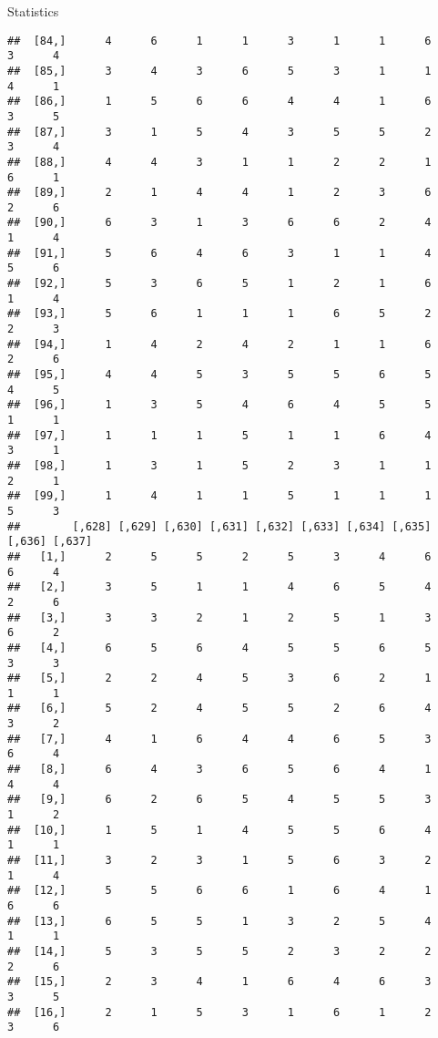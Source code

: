 \documentclass[
  ignorenonframetext,
]{beamer}
\begin{document}
\begin{frame}[fragile]{Statistics}
\begin{verbatim}
##  [84,]      4      6      1      1      3      1      1      6      3      4
##  [85,]      3      4      3      6      5      3      1      1      4      1
##  [86,]      1      5      6      6      4      4      1      6      3      5
##  [87,]      3      1      5      4      3      5      5      2      3      4
##  [88,]      4      4      3      1      1      2      2      1      6      1
##  [89,]      2      1      4      4      1      2      3      6      2      6
##  [90,]      6      3      1      3      6      6      2      4      1      4
##  [91,]      5      6      4      6      3      1      1      4      5      6
##  [92,]      5      3      6      5      1      2      1      6      1      4
##  [93,]      5      6      1      1      1      6      5      2      2      3
##  [94,]      1      4      2      4      2      1      1      6      2      6
##  [95,]      4      4      5      3      5      5      6      5      4      5
##  [96,]      1      3      5      4      6      4      5      5      1      1
##  [97,]      1      1      1      5      1      1      6      4      3      1
##  [98,]      1      3      1      5      2      3      1      1      2      1
##  [99,]      1      4      1      1      5      1      1      1      5      3
##        [,628] [,629] [,630] [,631] [,632] [,633] [,634] [,635] [,636] [,637]
##   [1,]      2      5      5      2      5      3      4      6      6      4
##   [2,]      3      5      1      1      4      6      5      4      2      6
##   [3,]      3      3      2      1      2      5      1      3      6      2
##   [4,]      6      5      6      4      5      5      6      5      3      3
##   [5,]      2      2      4      5      3      6      2      1      1      1
##   [6,]      5      2      4      5      5      2      6      4      3      2
##   [7,]      4      1      6      4      4      6      5      3      6      4
##   [8,]      6      4      3      6      5      6      4      1      4      4
##   [9,]      6      2      6      5      4      5      5      3      1      2
##  [10,]      1      5      1      4      5      5      6      4      1      1
##  [11,]      3      2      3      1      5      6      3      2      1      4
##  [12,]      5      5      6      6      1      6      4      1      6      6
##  [13,]      6      5      5      1      3      2      5      4      1      1
##  [14,]      5      3      5      5      2      3      2      2      2      6
##  [15,]      2      3      4      1      6      4      6      3      3      5
##  [16,]      2      1      5      3      1      6      1      2      3      6

\end{verbatim}
\end{frame}
\end{document}
